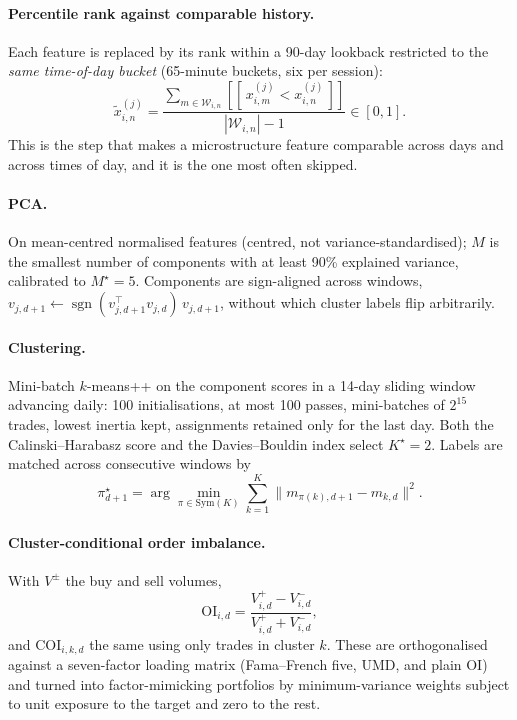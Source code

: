 \documentclass[11pt]{article}
\newcommand{\sgn}{\operatorname{sgn}}
\begin{document}
\paragraph{Percentile rank against comparable history.} Each feature is replaced
by its rank within a 90-day lookback restricted to the \emph{same time-of-day
bucket} (65-minute buckets, six per session):
\begin{equation}
\tilde x^{(j)}_{i,n}=\frac{\sum_{m\in\mathcal{W}_{i,n}}[\![\,x^{(j)}_{i,m}<x^{(j)}_{i,n}\,]\!]}{|\mathcal{W}_{i,n}|-1}\in[0,1].
\end{equation}
This is the step that makes a microstructure feature comparable across days and
across times of day, and it is the one most often skipped.

\paragraph{PCA.} On mean-centred normalised features (centred, not
variance-standardised); $M$ is the smallest number of components with at least
90\% explained variance, calibrated to $M^\star=5$. Components are
sign-aligned across windows,
$v_{j,d+1}\leftarrow\sgn(v_{j,d+1}^{\top}v_{j,d})\,v_{j,d+1}$, without which
cluster labels flip arbitrarily.

\paragraph{Clustering.} Mini-batch $k$-means++ on the component scores in a
14-day sliding window advancing daily: 100 initialisations, at most 100 passes,
mini-batches of $2^{15}$ trades, lowest inertia kept, assignments retained only
for the last day. Both the Calinski--Harabasz score and the Davies--Bouldin
index select $K^\star=2$. Labels are matched across consecutive windows by
\begin{equation}
\pi^\star_{d+1}=\arg\min_{\pi\in\mathrm{Sym}(K)}\sum_{k=1}^{K}\lVert m_{\pi(k),d+1}-m_{k,d}\rVert^2 .
\end{equation}

\paragraph{Cluster-conditional order imbalance.} With $V^{\pm}$ the buy and sell
volumes,
\begin{equation}
\mathrm{OI}_{i,d}=\frac{V^{+}_{i,d}-V^{-}_{i,d}}{V^{+}_{i,d}+V^{-}_{i,d}},
\end{equation}
and $\mathrm{COI}_{i,k,d}$ the same using only trades in cluster $k$. These are
orthogonalised against a seven-factor loading matrix (Fama--French five, UMD,
and plain OI) and turned into factor-mimicking portfolios by minimum-variance
weights subject to unit exposure to the target and zero to the rest.
\end{document}
